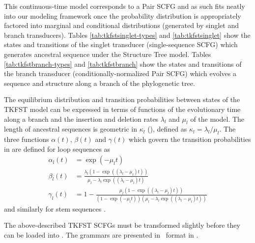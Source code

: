 \documentclass[10pt]{article}
\begin{document}
This continuous-time model corresponds to a Pair SCFG and as such
fits neatly into our modeling framework once the probability
distribution is appropriately factored into marginal and conditional
distributions (generated by singlet and branch transducers).
Tables \ref{tab:tkfstsinglet-types} and \ref{tab:tkfstsinglet} show the states 
and transitions of the singlet transducer (single-sequence SCFG) 
which generates ancestral sequence under the Structure Tree model.
Tables \ref{tab:tkfstbranch-types} and \ref{tab:tkfstbranch} show the states
and transitions of the branch transducer (conditionally-normalized Pair SCFG)
which evolves a sequence and structure along a branch of the phylogenetic tree.

The equilibrium distribution and transition probabilities between states of the TKFST model can be 
expressed in terms of functions of the evolutionary time along a branch
and the insertion and deletion rates $\lambda_l$ and $\mu_l$ of the model.
The length of ancestral sequences is geometric in $\kappa_l$ (), defined as $\kappa_l = \lambda_l / \mu_l$.
The three functions $\alpha(t)$, $\beta(t)$ and $\gamma(t)$ which govern 
the transition probabilities in  are defined
for loop sequences as
\begin{align}
  \alpha_l (t) &= \exp \left( -\mu_l t \right) \nonumber \\
  \beta_l (t) &= \frac{\lambda_l \left( 1 - \exp \left((\lambda_l - \mu_l) t \right) \right)}{\mu_l - \lambda_l \exp \left( (\lambda_l - \mu_l) t \right) } \nonumber \\
  \gamma_l (t) &= 1 - \frac{\mu_l \left( 1 - \exp \left((\lambda_l - \mu_l) t \right) \right)}{\left( 1 - \exp (- \mu_l t) \right) \left(\mu_l - \lambda_l \exp \left( (\lambda_l - \mu_l) t \right) \right) } \nonumber
\end{align}
and similarly for stem sequences \cite{Holmes2004}.

The above-described TKFST SCFGs must be transformed slightly before they can be loaded into \indiegram.
The grammars are presented in \indiegram\ format in .
\end{document}
